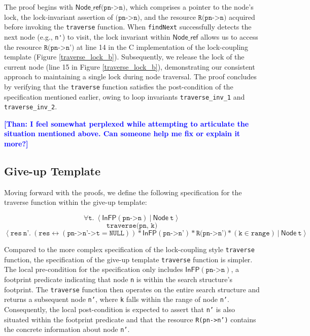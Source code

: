 \documentclass[a4paper,UKenglish,cleveref, autoref, thm-restate]{lipics-v2021}
\newcommand{\treerep}{\ensuremath{\mathsf{Node}}}
\newcommand{\nodeboxrep}{\ensuremath{\mathsf{Node\_ref}}}
\newcommand{\infp}{\ensuremath{\mathsf{InFP}}}
\newcommand{\than}[1]{\textbf{\textcolor{blue}{[Than: #1]}}}
\begin{document}
The proof begins with $\nodeboxrep \texttt{(pn->n)}$, which comprises a pointer to the node's lock, the lock-invariant assertion of $\texttt{(pn->n)}$, and the resource $\texttt{R(pn->n)}$ acquired before invoking the \lstinline{traverse} function. When \lstinline{findNext} successfully detects the next node (e.g., \lstinline{n'}) to visit, the lock invariant within $\nodeboxrep$ allows us to access the resource $\texttt{R(pn->n')}$ at line 14 in the C implementation of the lock-coupling template (Figure \ref{traverse_lock_b}). Subsequently, we release the lock of the current node (line 15 in Figure \ref{traverse_lock_b}), demonstrating our consistent approach to maintaining a single lock during node traversal. The proof concludes by verifying that the \lstinline{traverse} function satisfies the post-condition of the specification mentioned earlier, owing to loop invariants \texttt{traverse\_inv\_1} and \texttt{traverse\_inv\_2}.

\than{I feel somewhat perplexed while attempting to articulate the situation mentioned above. Can someone help me fix or explain it more?}


\subsection{Give-up Template}
Moving forward with the proofs, we define the following specification for the traverse function within the give-up template:

$$\forall \texttt{t}.\ \left\langle  \infp (\texttt{pn->n}) \ | \ \treerep\ \texttt{t} \right\rangle$$
$$\texttt{traverse(pn, k)}$$
$$\left\langle \texttt{res} \ \texttt{n'}. \ (\texttt{res} \leftrightarrow (\texttt{pn->n'->t} = \texttt{NULL})) \ast  \infp (\texttt{pn->n'}) \ast \texttt{R(pn->n')} \ast (\texttt{k} \in \texttt{range})
\ |\ \treerep\ \texttt{t} \right\rangle$$

Compared to the more complex specification of the lock-coupling style \texttt{traverse} function, the specification of the give-up template \texttt{traverse} function is simpler. The local pre-condition for the specification only includes $\infp (\texttt{pn->n})$, a footprint predicate indicating that node \texttt{n} is within the search structure's footprint. The \texttt{traverse} function then operates on the entire search structure and returns a subsequent node \texttt{n'}, where \texttt{k} falls within the range of node \texttt{n'}. Consequently, the local post-condition is expected to assert that \texttt{n'} is also situated within the footprint predicate and that the resource \texttt{R(pn->n')} contains the concrete information about node \texttt{n'}.
\end{document}
